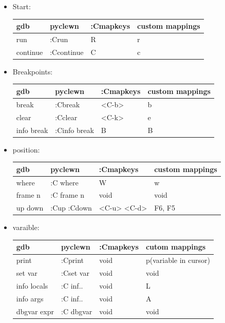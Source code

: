 \documentclass[paper=8.5in:11in, twoside, 12pt, pagesize=pdftex]{book}
\begin{document}
\begin{itemize}
										\item Start: \\
										\begin{tabular}{p{0.25\textwidth}|p{0.25\textwidth}|p{}|p{}}
											\hline 
											gdb & pyclewn & :Cmapkeys & custom mappings \\
											\hline
											run & :Crun & R & r\\
											\hline 
											continue & :Ccontinue & C& c\\
											\hline 
										\end{tabular}
										
										\item Breakpoints: \\
										\begin{tabular}{p{}|p{}|p{}|p{}}
											\hline 
											gdb & pyclewn & :Cmapkeys & custom mappings \\
											\hline
											break & :Cbreak & <C-b> & b\\
											\hline 
											clear & :Cclear & <C-k>& e\\
											\hline 
											info break & :Cinfo break & B& B \\
											\hline
										\end{tabular}
										
										\item position: \\
										\begin{tabular}{p{}|p{}|p{}|p{}}
											\hline 
											gdb & pyclewn & :Cmapkeys & custom mappings \\
											\hline
											where & :C where & W & w\\
											\hline 
											frame n & :C frame n & void &void \\
											\hline 
											up down & :Cup :Cdown & <C-u> <C-d> &F6, F5\\
											\hline
										\end{tabular}
										
										\item varaible: \\
										\begin{tabular}{p{}|p{}|p{}|p{}}
											\hline 
											gdb & pyclewn & :Cmapkeys & cutom mappings\\
											\hline
											print &:Cprint  &void & p(variable in cursor) \\
											\hline 
											set var  & :Cset var & void& void \\
											\hline 
											info locals & :C inf.. & void & L\\
											\hline
											info args & :C inf.. & void & A \\
											\hline
											dbgvar expr & :C dbgvar & void& void \\
											\hline 
										\end{tabular}
										

\end{itemize}
\end{document}
